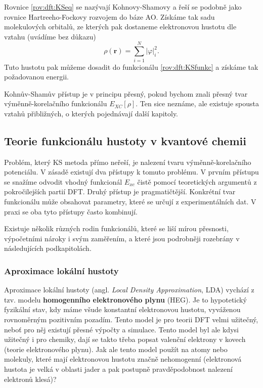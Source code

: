 Rovnice \ref{rov:dft:KSeq} se nazývají Kohnovy-Shamovy a řeší se podobně jako rovnice Hartreeho-Fockovy rozvojem do báze AO.
Získáme tak sadu molekulových orbitalů, ze kterých pak dostaneme elektronovou hustotu dle vztahu (uvádíme bez důkazu)
\begin{equation}
\rho(\textbf{r}) = \sum_{i=1}^N |\varphi|_i^2.
\label{rov:dft:KSrho}
\end{equation}
Tuto hustotu pak můžeme dosadit do funkcionálu \eqref{rov:dft:KSfunkc} a získáme tak požadovanou energii.

Kohnův-Shamův přístup je v principu přesný, pokud bychom znali přesný tvar výměnně-korelačního funkcionálu $E_{XC}[\rho]$.
Ten sice neznáme, ale existuje spousta vztahů přibližných, o kterých pojednávají další kapitoly.

\subsection{Teorie funkcionálu hustoty v kvantové chemii}

Problém, který KS metoda přímo neřeší, je nalezení tvaru výměnně-korelačního potenciálu.
V zásadě existují dva přístupy k tomuto problému. V prvním přístupu se snažíme odvodit vhodný funkcionál $E_{xc}$ čistě pomocí teoretických argumentů z pokročilejších partií DFT. Druhý přístup je pragmatičtější. Konkrétní tvar funkcionálu může obsahovat parametry, které se určují z experimentálních dat. V praxi se oba tyto přístupy často kombinují.

Existuje několik různých rodin funkcionálů, které se liší mírou přesnosti, výpočetními nároky i svým zaměřením, a které jsou podrobněji rozebrány v následujících podkapitolách.

\subsubsection{Aproximace lokální hustoty}

Aproximace lokální hustoty (angl. \textit{Local Density Approximation}, LDA) vychází z tzv. modelu \textbf{homogenního elektronového plynu} (HEG). Je to hypotetický fyzikální stav, kdy máme všude konstantní elektronovou hustotu, vyváženou rovnoměrným pozitivním pozadím. Tento model je pro teorii DFT velmi užitečný, neboť pro něj existují přesné výpočty a simulace. Tento model byl ale kdysi užitečný i pro chemiky, dají se takto třeba popsat valenční elektrony v kovech (teorie elektronového plynu). Jak ale tento model použít na atomy nebo molekuly, které mají elektronovou hustotu značně nehomogenní (elektronová hustota je velká v oblasti jader a pak postupně pravděpodobnost nalezení elektronů klesá)?

